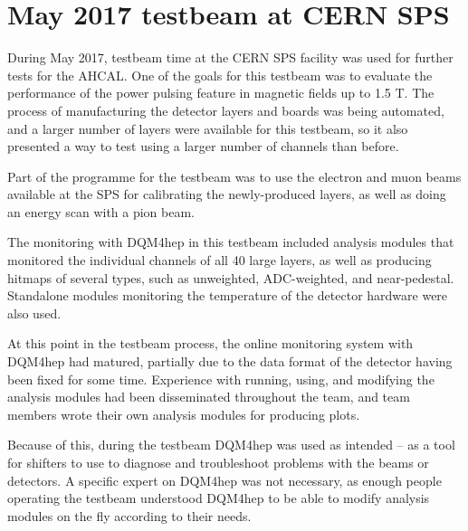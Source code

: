 \section{May 2017 testbeam at CERN SPS} %


During May 2017, testbeam time at the \acrshort{CERN} \acrfull{SPS} facility was used for further tests for the \acrshort{AHCAL}. One of the goals for this testbeam was to evaluate the performance of the power pulsing feature in magnetic fields up to 1.5 T. The process of manufacturing the detector layers and boards was being automated, and a larger number of layers were available for this testbeam, so it also presented a way to test using a larger number of channels than before. 

Part of the programme for the testbeam was to use the electron and muon beams available at the \acrshort{SPS} for calibrating the newly-produced layers, as well as doing an energy scan with a pion beam.

The monitoring with \acrshort{DQM4hep} in this testbeam included analysis modules that monitored the individual channels of all 40 large layers, as well as producing hitmaps of several types, such as unweighted, \acrshort{ADC}-weighted, and near-pedestal. Standalone modules monitoring the temperature of the detector hardware were also used. 

At this point in the testbeam process, the online monitoring system with \acrshort{DQM4hep} had matured, partially due to the data format of the detector having been fixed for some time. Experience with running, using, and modifying the analysis modules had been disseminated throughout the team, and team members wrote their own analysis modules for producing plots.

Because of this, during the testbeam \acrshort{DQM4hep} was used as intended -- as a tool for shifters to use to diagnose and troubleshoot problems with the beams or detectors. A specific expert on \acrshort{DQM4hep} was not necessary, as enough people operating the testbeam understood \acrshort{DQM4hep} to be able to modify analysis modules on the fly according to their needs.

